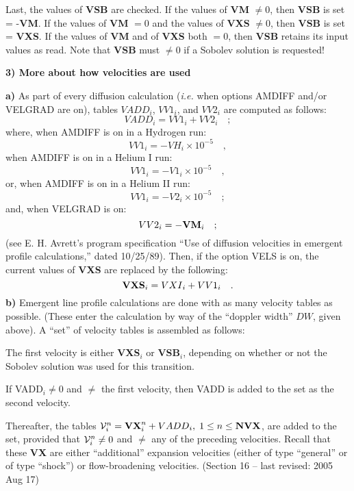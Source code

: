 Last, the values of {\bf VSB} are checked. If the values of {\bf VM}
$\neq 0$, then {\bf VSB} is set = -{\bf VM}. If the values of
{\bf VM} $= 0$ and the values of {\bf VXS} $\neq 0$, then {\bf VSB} is
set = {\bf VXS}. If the values of {\bf VM} and of {\bf VXS} both
$= 0$, then {\bf VSB} retains its input values as read. Note that
{\bf VSB} must $\neq 0$ if a Sobolev solution is requested!
\ej
\centerline{{\bf 3) More about how velocities are used}}
\blankline
{\bf a)} As part of every diffusion calculation ({\it i.e.} when options
AMDIFF and/or VELGRAD are on), tables ${VADD}_i$, ${VV1}_i$, and
${VV2}_i$ are computed as follows: 
$$ {VADD}_i = {VV1}_i + {VV2}_i \quad ; $$ \np
where, when AMDIFF is on in a Hydrogen run:
$$ {VV1}_i = - {VH}_i \times 10^{-5} \quad , $$ \np
when AMDIFF is on in a Helium I run:
$$ {VV1}_i = - {V1}_i \times 10^{-5} \quad , $$ \np
or, when AMDIFF is on in a Helium II run:
$$ {VV1}_i = - {V2}_i \times 10^{-5} \quad ; $$ \np
and, when VELGRAD is on:
$$ {VV2}_i = - {\bf VM}_i \quad ; $$ \np
(see E. H. Avrett's program specification ``Use of diffusion velocities
in emergent profile calculations,'' dated 10/25/89). Then, if the
option VELS is on, the current values of {\bf VXS} are replaced
by the following:
$$ {\bf VXS}_i = {VXI}_i + {VV1}_i \quad . $$
\ej
{\bf b)} Emergent line profile calculations are done with as many
velocity tables as possible. (These enter the calculation
by way of the ``doppler width'' ${DW}$, given above).
A ``set'' of velocity tables is assembled as follows:

The first velocity is either {\bf VXS}$_i$ or {\bf VSB}$_i$, depending
on whether or not the Sobolev solution was used for this transition.

If {VADD}$_i \neq 0$ and $\neq$ the first velocity, then {VADD} is added
to the set as the second velocity.

Thereafter, the tables ${\cal V}^n_i = {\bf VX}^n_i + {VADD}_i, \;
1 \leq n \leq {\bf NVX}$, are added to \break the set, 
provided that ${\cal V}^n_i \neq 0$ and $\neq$ any of the 
preceding velocities. Recall that these {\bf VX} are either
``additional'' expansion velocities (either of type ``general''
or of type ``shock'') or flow-broadening velocities.
\vfill
\noindent (Section 16 -- last revised: 2005 Aug 17) \par
{}
\ej
